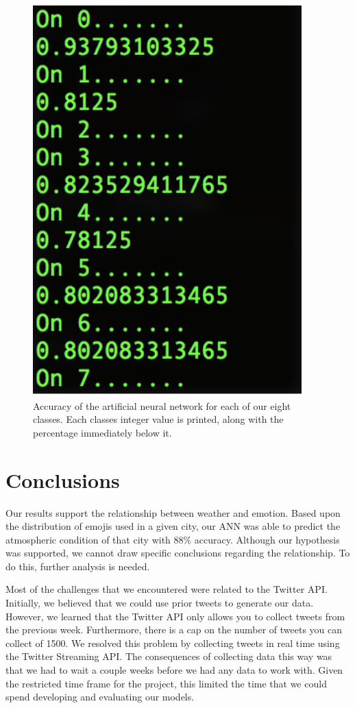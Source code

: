 \documentclass[12pt]{article}
\begin{document}
\begin{figure}[H]
\includegraphics[scale=0.6]{ann}
\centering
\caption{Accuracy of the artificial neural network for each of our eight classes. Each classes integer value is printed, along with the percentage immediately below it.}
\label{fig:ann}
\end{figure}

\section{Conclusions}\label{conclusions}
Our results support the relationship between weather and emotion. Based upon the distribution of emojis used in a given city, our ANN was able to predict the atmospheric condition of that city with 88\% accuracy. Although our hypothesis was supported, we cannot draw specific conclusions regarding the relationship. To do this, further analysis is needed.

Most of the challenges that we encountered were related to the Twitter API. Initially, we believed that we could use prior tweets to generate our data. However, we learned that the Twitter API only allows you to collect tweets from the previous week. Furthermore, there is a cap on the number of tweets you can collect of 1500. We resolved this problem by collecting tweets in real time using the Twitter Streaming API. The consequences of collecting data this way was that we had to wait a couple weeks before we had any data to work with. Given the restricted time frame for the project, this limited the time that we could spend developing and evaluating our models.
\end{document}
